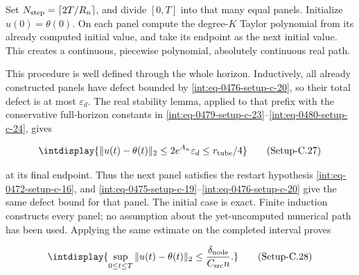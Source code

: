 
Set \(N_{\rm step}=\lceil2T/R_n\rceil\), and divide \([0,\allowbreak T]\) into that many equal panels. Initialize \(u(0)=\theta(0)\). On each panel compute the degree-\(K\) Taylor polynomial from its already computed initial value, and take its endpoint as the next initial value. This creates a continuous, piecewise polynomial, absolutely continuous real path.



This procedure is well defined through the whole horizon. Inductively, all already constructed panels have defect bounded by \hyperref[int:eq-setup-c-20]{\eqref{int:eq-0476-setup-c-20}}, so their total defect is at most \(\varepsilon_d\). The real stability lemma, applied to that prefix with the conservative full-horizon constants in \hyperref[int:eq-setup-c-23]{\eqref{int:eq-0479-setup-c-23}}--\allowbreak \hyperref[int:eq-setup-c-24]{\eqref{int:eq-0480-setup-c-24}}, gives


\label{int:eq-setup-c-27}
\begingroup\renewcommand{\theHequation}{intdisplay.956}
\begin{equation}
\intdisplay{
\|u(t)-\theta(t)\|_2\le2e^{A_n}\varepsilon_d\le r_{\rm tube}/4
}
\tag{Setup-C.27}
\label{int:eq-0483-setup-c-27}
\end{equation}
\endgroup


at its final endpoint. Thus the next panel satisfies the restart hypothesis \hyperref[int:eq-setup-c-16]{\eqref{int:eq-0472-setup-c-16}}, and \hyperref[int:eq-setup-c-19]{\eqref{int:eq-0475-setup-c-19}}--\allowbreak \hyperref[int:eq-setup-c-20]{\eqref{int:eq-0476-setup-c-20}} give the same defect bound for that panel. The initial case is exact. Finite induction constructs every panel; no assumption about the yet-uncomputed numerical path has been used. Applying the same estimate on the completed interval proves


\label{int:eq-setup-c-28}
\begingroup\renewcommand{\theHequation}{intdisplay.957}
\begin{equation}
\intdisplay{
\sup_{0\le t\le T}\|u(t)-\theta(t)\|_2
\le\frac{\delta_{\rm node}}{C_{\rm src}n}.
}
\tag{Setup-C.28}
\label{int:eq-0484-setup-c-28}
\end{equation}
\endgroup


